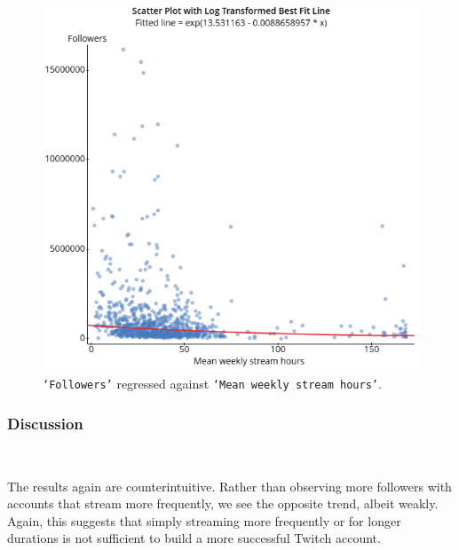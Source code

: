\documentclass[12pt]{article}
\begin{document}
\begin{figure}[H]
\centering
	\includegraphics[scale=0.65]{../StatCrunch_Results/ln_followers_stream/scatter_small}
	\captionsetup{justification=centering, singlelinecheck=false, margin=2cm}
	\caption[Scatter Plot: Followers by Stream Time]{\texttt{`Followers'} regressed against \texttt{`Mean weekly stream hours'}. }
	\label{fig:ln_followers_stream_scatter}
\end{figure}

\subsubsection{Discussion}\

The results again are counterintuitive. Rather than observing more followers with accounts that stream more frequently, we see the opposite trend, albeit weakly. Again, this suggests that simply streaming more frequently or for longer durations is not sufficient to build a more successful Twitch account.
\end{document}
